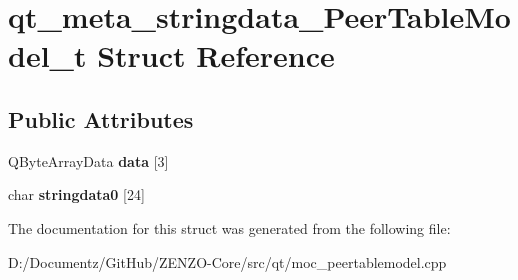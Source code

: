 \hypertarget{structqt__meta__stringdata___peer_table_model__t}{}\section{qt\+\_\+meta\+\_\+stringdata\+\_\+\+Peer\+Table\+Model\+\_\+t Struct Reference}
\label{structqt__meta__stringdata___peer_table_model__t}
\subsection*{Public Attributes}
\begin{DoxyCompactItemize}
\item 
\mbox{\label{structqt__meta__stringdata___peer_table_model__t_affa157b939f31fd45c734e038c56e8f8}} 
Q\+Byte\+Array\+Data {\bfseries data} \mbox{[}3\mbox{]}
\item 
\mbox{\label{structqt__meta__stringdata___peer_table_model__t_af4f0584fb860dfde80fad1cdac0d6208}} 
char {\bfseries stringdata0} \mbox{[}24\mbox{]}
\end{DoxyCompactItemize}


The documentation for this struct was generated from the following file\+:\begin{DoxyCompactItemize}
\item 
D\+:/\+Documentz/\+Git\+Hub/\+Z\+E\+N\+Z\+O-\/\+Core/src/qt/moc\+\_\+peertablemodel.\+cpp\end{DoxyCompactItemize}
